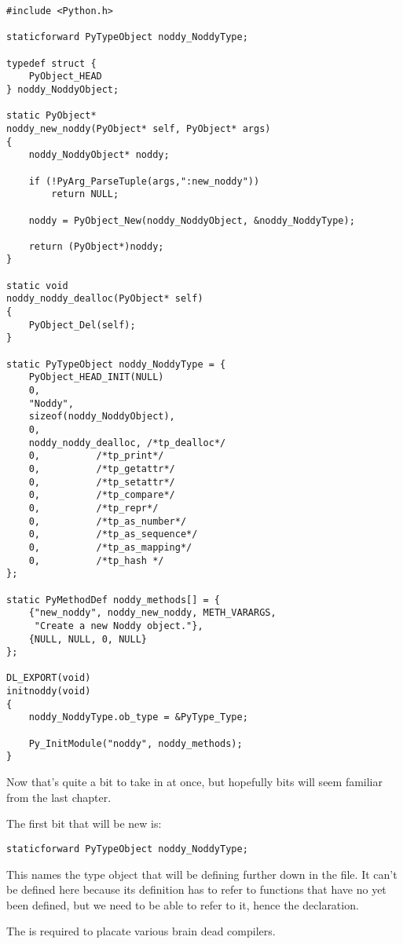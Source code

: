 \begin{verbatim}
#include <Python.h>

staticforward PyTypeObject noddy_NoddyType;

typedef struct {
    PyObject_HEAD
} noddy_NoddyObject;

static PyObject*
noddy_new_noddy(PyObject* self, PyObject* args)
{
    noddy_NoddyObject* noddy;

    if (!PyArg_ParseTuple(args,":new_noddy")) 
        return NULL;

    noddy = PyObject_New(noddy_NoddyObject, &noddy_NoddyType);

    return (PyObject*)noddy;
}

static void
noddy_noddy_dealloc(PyObject* self)
{
    PyObject_Del(self);
}

static PyTypeObject noddy_NoddyType = {
    PyObject_HEAD_INIT(NULL)
    0,
    "Noddy",
    sizeof(noddy_NoddyObject),
    0,
    noddy_noddy_dealloc, /*tp_dealloc*/
    0,          /*tp_print*/
    0,          /*tp_getattr*/
    0,          /*tp_setattr*/
    0,          /*tp_compare*/
    0,          /*tp_repr*/
    0,          /*tp_as_number*/
    0,          /*tp_as_sequence*/
    0,          /*tp_as_mapping*/
    0,          /*tp_hash */
};

static PyMethodDef noddy_methods[] = {
    {"new_noddy", noddy_new_noddy, METH_VARARGS,
     "Create a new Noddy object."},
    {NULL, NULL, 0, NULL}
};

DL_EXPORT(void)
initnoddy(void) 
{
    noddy_NoddyType.ob_type = &PyType_Type;

    Py_InitModule("noddy", noddy_methods);
}
\end{verbatim}

Now that's quite a bit to take in at once, but hopefully bits will
seem familiar from the last chapter.

The first bit that will be new is:

\begin{verbatim}
staticforward PyTypeObject noddy_NoddyType;
\end{verbatim}

This names the type object that will be defining further down in the
file.  It can't be defined here because its definition has to refer to
functions that have no yet been defined, but we need to be able to
refer to it, hence the declaration.

The  is required to placate various brain dead
compilers.

